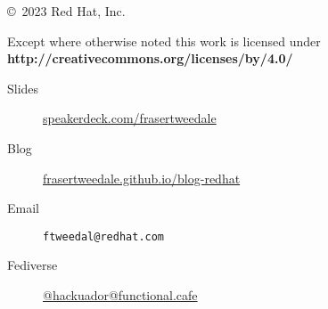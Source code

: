 \documentclass[ignorenonframetext,aspectratio=169,12pt]{beamer}
\begin{document}
\begin{frame}[plain]
\begin{columns}

  \begin{column}{.6\textwidth}

    \setlength{\parskip}{.5em}

    { \centering

    

    \copyright~2023  Red Hat, Inc.

    { \scriptsize
    Except where otherwise noted this work is licensed under
    }
    { \footnotesize
    \textbf{http://creativecommons.org/licenses/by/4.0/}
    }

    }

    \begin{description}
      \item[Slides] \href{https://speakerdeck.com/frasertweedale}{speakerdeck.com/frasertweedale}
      \item[Blog] \href{https://frasertweedale.github.io/blog-redhat/}{frasertweedale.github.io/blog-redhat}
      \item[Email] \texttt{ftweedal@redhat.com}
      \item[Fediverse] \href{https://functional.cafe/@hackuador}{@hackuador@functional.cafe}
    \end{description}
  \end{column}

\end{columns}
\end{frame}
\end{document}
